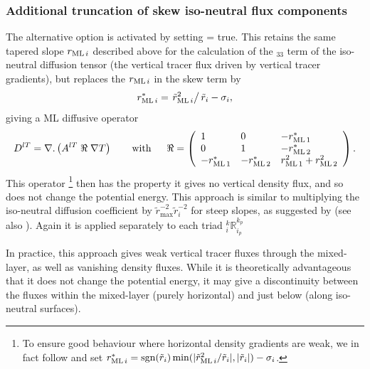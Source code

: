 \subsubsection{Additional truncation of skew iso-neutral flux
  components}
\label{sec:triad:Gerdes-taper}
The alternative option is activated by setting  =
  true. This retains the same tapered slope $r_{\mathrm{ML}\,i}$  described above for the
calculation of the $_{33}$ term of the iso-neutral diffusion tensor (the
vertical tracer flux driven by vertical tracer gradients), but
replaces the $r_{\mathrm{ML}\,i}$ in the skew term by
\begin{equation}
  \label{eq:triad:rm*}
  r_{\mathrm{ML}\,i}^*=\left.\tilde{r}_{\mathrm{ML}\,i}^2\right/\tilde{r}_i-\sigma_i,
\end{equation}
giving a ML diffusive operator
\begin{equation} \label{eq:triad:iso_tensor_ML2}
D^{lT}=\nabla {\rm {\bf .}}\left( {A^{lT}\;\Re \;\nabla T} \right) \qquad
\mbox{with}\quad \;\;\Re =\left( {{\begin{array}{*{20}c}
 1 \hfill & 0 \hfill & {-\rML[1]^*}\hfill \\
 0 \hfill & 1 \hfill & {-\rML[2]^*} \hfill \\
 {-\rML[1]^*}\hfill &   {-\rML[2]^*} \hfill & {\rML[1]^2+\rML[2]^2} \hfill \\
\end{array} }} \right).
\end{equation}
This operator
\footnote{To ensure good behaviour where horizontal density
  gradients are weak, we in fact follow \citet{Gerdes1991} and set
$r_{\mathrm{ML}\,i}^*=\mathrm{sgn}(\tilde{r}_i)\min(|\tilde{r}_{\mathrm{ML}\,i}^2/\tilde{r}_i|,|\tilde{r}_i|)-\sigma_i$.}
then has the property it gives no vertical density flux, and so does
not change the potential energy.
This approach is similar to multiplying the iso-neutral  diffusion
coefficient by $\tilde{r}_\mathrm{max}^{-2}\tilde{r}_i^{-2}$ for steep
slopes, as suggested by \citet{Gerdes1991} (see also \citet{Griffies_Bk04}).
Again it is applied separately to each triad $_i^k\mathbb{R}_{i_p}^{k_p}$

In practice, this approach gives weak vertical tracer fluxes through
the mixed-layer, as well as vanishing density fluxes. While it is
theoretically advantageous that it does not change the potential
energy, it may give a discontinuity between the
fluxes within the mixed-layer (purely horizontal) and just below (along
iso-neutral surfaces).
